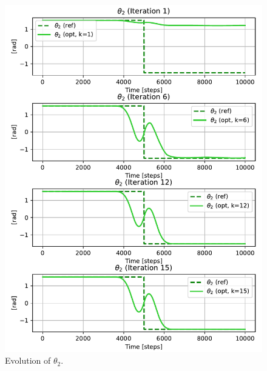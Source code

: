 \begin{figure}[htb]
    \centering
    \includegraphics[width=1\linewidth]{img/1-Task1/th2_evolution.pdf}
    \caption{Evolution of $\theta_2$.}
    \label{fig:theta2-evolution}
\end{figure}

